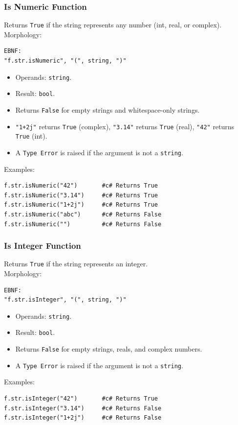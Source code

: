 \subsubsection{Is Numeric Function}
Returns \texttt{True} if the string represents any number (int, real, or complex). \\
Morphology:
\begin{verbatim}
EBNF:
"f.str.isNumeric", "(", string, ")"
\end{verbatim}
\begin{itemize}
\item Operands: \texttt{string}.
\item Result: \texttt{bool}.
\item Returns \texttt{False} for empty strings and whitespace-only strings.
\item \texttt{"1+2j"} returns \texttt{True} (complex), \texttt{"3.14"} returns \texttt{True} (real), \texttt{"42"} returns \texttt{True} (int).
\item A \texttt{Type Error} is raised if the argument is not a \texttt{string}.
\end{itemize}
Examples:
\begin{verbatim}
f.str.isNumeric("42")       #c# Returns True
f.str.isNumeric("3.14")     #c# Returns True
f.str.isNumeric("1+2j")     #c# Returns True
f.str.isNumeric("abc")      #c# Returns False
f.str.isNumeric("")         #c# Returns False
\end{verbatim}

\subsubsection{Is Integer Function}
Returns \texttt{True} if the string represents an integer. \\
Morphology:
\begin{verbatim}
EBNF:
"f.str.isInteger", "(", string, ")"
\end{verbatim}
\begin{itemize}
\item Operands: \texttt{string}.
\item Result: \texttt{bool}.
\item Returns \texttt{False} for empty strings, reals, and complex numbers.
\item A \texttt{Type Error} is raised if the argument is not a \texttt{string}.
\end{itemize}
Examples:
\begin{verbatim}
f.str.isInteger("42")       #c# Returns True
f.str.isInteger("3.14")     #c# Returns False
f.str.isInteger("1+2j")     #c# Returns False
\end{verbatim}

